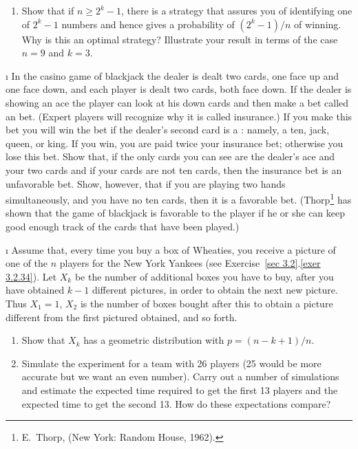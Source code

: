 \begin{LJSItem}
\begin{enumerate}
\item Show that if $n \geq 2^k - 1$, there is a strategy that assures you of
identifying one of $2^k - 1$ numbers and hence gives a probability of $(2^k - 1)/n$
of winning.  Why is this an optimal strategy?  Illustrate your result in terms of the
case $n = 9$ and $k = 3$.
\end{enumerate}

\i\label{exer 6.1.29} In the casino game of blackjack the dealer is dealt two
cards, one face up and one face down, and each player is dealt two cards, both face
down.  If the dealer is showing an ace the player can look at his down cards and then
make a bet called an   bet.  (Expert players will recognize why it is
called insurance.)  If you make this bet you will win the bet if the dealer's second
card is a : namely, a ten, jack, queen, or king.  If you win, you are
paid twice your insurance bet; otherwise you lose this bet.  Show that, if the only
cards you can see are the dealer's ace and your two cards and if your cards are not
ten cards, then the insurance bet is an unfavorable bet.  Show, however, that if you
are playing two hands simultaneously, and you have no ten cards, then it is a
favorable bet.  (Thorp\footnote{E.~Thorp,   (New York: Random
House, 1962).} has shown that the game of blackjack is favorable to the player if he or she can keep
good enough track of the cards that have been played.)

\i\label{exer 6.1.30} Assume that, every time you buy a box of Wheaties, you
receive a picture of one of the $n$ players for the New York Yankees (see
Exercise~\ref{sec 3.2}.\ref{exer 3.2.34}).  Let $X_k$ be the
number of additional boxes you have to buy, after you have obtained $k - 1$ different
pictures, in order to obtain the next new picture.  Thus $X_1 = 1$, $X_2$ is the number
of boxes bought after this to obtain a picture different from the first pictured
obtained, and so forth.

\begin{enumerate}
\item Show that $X_k$ has a geometric distribution with $p = (n - k + 1)/n$.

\item Simulate the experiment for a team with 26 players (25 would be more accurate
but we want an even number).  Carry out a number of simulations and estimate the
expected time required to get the first 13 players and the expected time to get the
second 13.  How do these expectations compare?


\end{enumerate}
\end{LJSItem}
